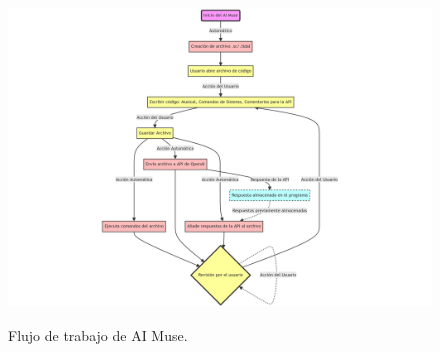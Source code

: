 \begin{figure}[H]
    \caption[Flujo de trabajo de AI Muse]{Flujo de trabajo de AI Muse.}
    \centering
    \includegraphics[width=1\textwidth]{./figuras/flujo_aimuse.png}
    \source{\propio}
    \label{fig:ai_muse_flow}
\end{figure}


    
